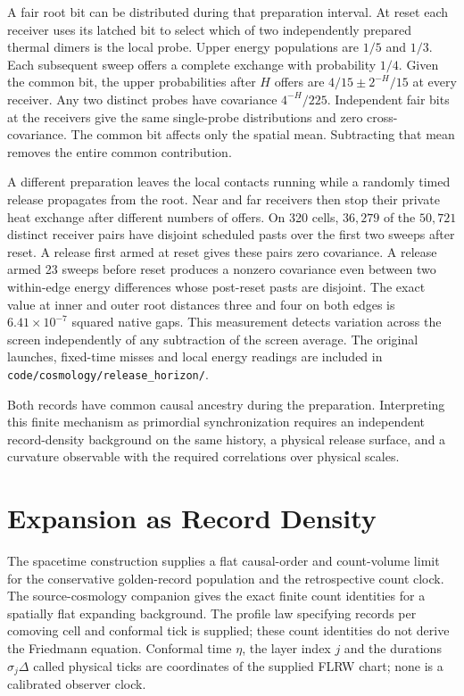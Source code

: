 \documentclass[11pt]{article}
\theoremstyle{remark}
\theoremstyle{plain}
\newcommand{\pathref}[1]{\nolinkurl{#1}}
\begin{document}
A fair root bit can be distributed during that preparation interval.
At reset each receiver uses its latched bit to select which of two
independently prepared thermal dimers is the local probe. Upper energy
populations are \(1/5\) and \(1/3\). Each subsequent sweep offers a complete
exchange with probability \(1/4\). Given the common bit, the upper
probabilities after \(H\) offers are \(4/15\pm2^{-H}/15\) at every
receiver. Any two distinct probes have covariance \(4^{-H}/225\).
Independent fair bits at the receivers give the same single-probe
distributions and zero cross-covariance. The common bit affects only the
spatial mean. Subtracting that mean removes the entire common contribution.

A different preparation leaves the local contacts running while a randomly
timed release propagates from the root. Near and far receivers then stop
their private heat exchange after different numbers of offers. On 320
cells, \(36{,}279\) of the \(50{,}721\) distinct receiver pairs have
disjoint scheduled pasts over the first two sweeps after reset. A release
first armed at reset gives these pairs zero covariance. A release armed
23 sweeps before reset produces a nonzero covariance even between two
within-edge energy differences whose post-reset pasts are disjoint.
The exact value at inner and outer root distances three and four on both
edges is \(6.41\times10^{-7}\) squared native gaps. This measurement
detects variation across the screen independently of any subtraction of
the screen average. The original launches, fixed-time misses and local
energy readings are included in \pathref{code/cosmology/release_horizon/}.

Both records have common causal ancestry during the preparation.
Interpreting this finite mechanism as primordial synchronization requires
an independent record-density background on the same history, a physical
release surface, and a curvature observable with the required correlations
over physical scales.

\section{Expansion as Record Density}
\label{sec:expansion-record-density}

The spacetime construction supplies a flat causal-order and count-volume
limit for the conservative golden-record population and the retrospective
count clock. The source-cosmology companion gives the exact finite count identities
for a spatially flat expanding background. The profile law specifying
records per comoving cell and conformal tick is supplied; these count
identities do not derive the Friedmann equation. Conformal time \(\eta\), the layer index
\(j\) and the durations \(\sigma_j\Delta\) called physical ticks are
coordinates of the supplied FLRW chart; none is a calibrated observer clock.
\end{document}
